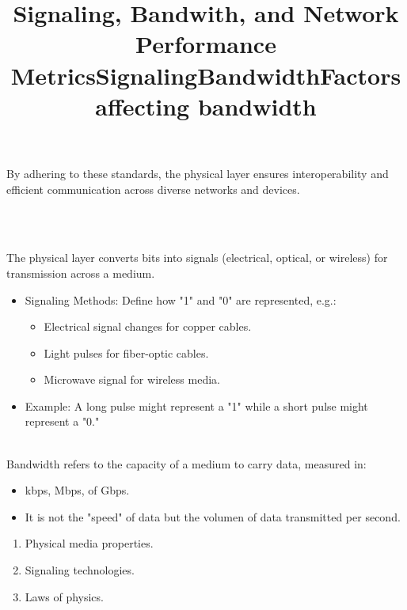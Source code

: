 \documentclass[a4paper,11pt]{article}
\begin{document}
By adhering to these standards, the physical layer ensures interoperability and efficient communication across diverse networks and devices.\\

\title{Signaling, Bandwith, and Network Performance Metrics}\\
\title{Signaling}\\
The physical layer converts bits into signals (electrical, optical, or wireless) for transmission across a medium.\\
\begin{itemize}
    \item Signaling Methods: Define how "1" and "0" are represented, e.g.:\\
    \begin{itemize}
        \item Electrical signal changes for copper cables.\\
        \item Light pulses for fiber-optic cables.\\
        \item Microwave signal for wireless media.\\
    \end{itemize}
    \item Example: A long pulse might represent a "1" while a short pulse might represent a "0."\\
\end{itemize}

\title{Bandwidth}\\
Bandwidth refers to the capacity of a medium to carry data, measured in:\\
\begin{itemize}
    \item kbps, Mbps, of Gbps.\\
    \item It is not the "speed" of data but the volumen of data transmitted per second.\\
\end{itemize}

\title{Factors affecting bandwidth}
\begin{enumerate}
    \item Physical media properties.\\
    \item Signaling technologies.\\
    \item Laws of physics.\\
\end{enumerate}
\end{document}
